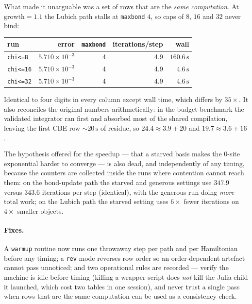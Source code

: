 \documentclass[11pt,a4paper]{article}
\newcommand{\code}[1]{\texttt{\small #1}}
\begin{document}
What made it unarguable was a set of rows that are the \emph{same computation}. At
$\text{growth}=1.1$ the Lubich path stalls at \code{maxbond} $4$, so caps of $8$, $16$ and $32$
never bind:

\begin{center}
\begin{tabular}{@{}lrrrr@{}}
\toprule
run & error & \code{maxbond} & iterations/step & wall \\
\midrule
\code{chi<=8}  & $5.710\times10^{-3}$ & 4 & 4.9 & $160.6\,\mathrm{s}$ \\
\code{chi<=16} & $5.710\times10^{-3}$ & 4 & 4.9 & $4.6\,\mathrm{s}$ \\
\code{chi<=32} & $5.710\times10^{-3}$ & 4 & 4.9 & $4.6\,\mathrm{s}$ \\
\bottomrule
\end{tabular}
\end{center}

\noindent
Identical to four digits in every column except wall time, which differs by $35\times$. It also
reconciles the original numbers arithmetically: in the budget benchmark the validated
integrator ran first and absorbed most of the shared compilation, leaving the first CBE row
$\sim20\,\mathrm{s}$ of residue, so $24.4 \approx 3.9 + 20$ and $19.7 \approx 3.6 + 16$.

The hypothesis offered for the speedup --- that a starved basis makes the $0$-site exponential
harder to converge --- is also dead, and independently of any timing, because the counters are
collected inside the runs where contention cannot reach them: on the bond-update path the
starved and generous settings use $347.9$ versus $343.6$ iterations per step (identical), with
the generous run doing \emph{more} total work; on the Lubich path the starved setting uses
$6\times$ fewer iterations on $4\times$ smaller objects.

\paragraph{Fixes.} A \code{warmup} routine now runs one throwaway step per path and per
Hamiltonian before any timing; a \code{rev} mode reverses row order so an order-dependent
artefact cannot pass unnoticed; and two operational rules are recorded --- verify the machine is
idle before timing (killing a wrapper script does \emph{not} kill the Julia child it launched,
which cost two tables in one session), and never trust a single pass when rows that are the same
computation can be used as a consistency check.
\end{document}
